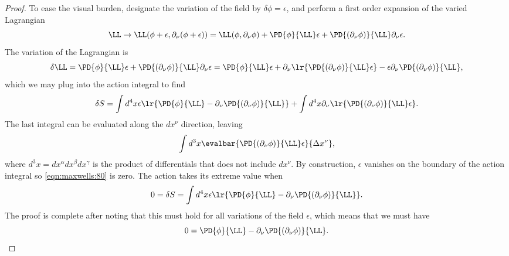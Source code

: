 \begin{proof}
To ease the visual burden, designate the variation of the field by \( \delta \phi = \epsilon \), and perform a first order expansion of the varied Lagrangian
\begin{dmath}\label{eqn:maxwells:20}
\LL \rightarrow
\LL(\phi + \epsilon, \partial_\nu (\phi + \epsilon))
=
\LL(\phi, \partial_\nu \phi)
+
\PD{\phi}{\LL} \epsilon +
\PD{(\partial_\nu \phi)}{\LL} \partial_\nu \epsilon.
\end{dmath}
The variation of the Lagrangian is
\begin{dmath}\label{eqn:maxwells:40}
\delta \LL =
\PD{\phi}{\LL} \epsilon +
\PD{(\partial_\nu \phi)}{\LL} \partial_\nu \epsilon
=
\PD{\phi}{\LL} \epsilon +
\partial_\nu \lr{ \PD{(\partial_\nu \phi)}{\LL} \epsilon }
-
\epsilon \partial_\nu \PD{(\partial_\nu \phi)}{\LL},
\end{dmath}
which we may plug into the action integral to find
\begin{dmath}\label{eqn:maxwells:60}
   \delta S =
   \int d^4 x \epsilon \lr{
   \PD{\phi}{\LL}
   -
   \partial_\nu \PD{(\partial_\nu \phi)}{\LL}
}
+
   \int d^4 x
\partial_\nu \lr{ \PD{(\partial_\nu \phi)}{\LL} \epsilon }.
\end{dmath}
The last integral can be evaluated along the \( dx^\nu \) direction, leaving
\begin{dmath}\label{eqn:maxwells:80}
   \int d^3 x
   \evalbar{ \PD{(\partial_\nu \phi)}{\LL} \epsilon }{\Delta x^\nu},
\end{dmath}
where \( d^3 x = dx^\alpha dx^\beta dx^\gamma \) is the product of differentials that does not include \( dx^\nu \).  By construction, \( \epsilon \) vanishes on the boundary of the action integral so \cref{eqn:maxwells:80} is zero.  The action takes its extreme value when
\begin{dmath}\label{eqn:maxwells:100}
0 = \delta S
=
\int d^4 x \epsilon \lr{
   \PD{\phi}{\LL}
   -
   \partial_\nu \PD{(\partial_\nu \phi)}{\LL}
}.
\end{dmath}
The proof is complete after noting that this must hold for all variations of the field \( \epsilon \), which means that we must have
\begin{dmath}\label{eqn:maxwells:120}
0  =
   \PD{\phi}{\LL}
   -
   \partial_\nu \PD{(\partial_\nu \phi)}{\LL}.
\end{dmath}
\end{proof}
